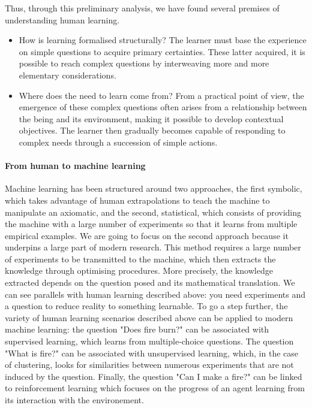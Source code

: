 Thus, through this preliminary analysis, we have found several premises of understanding human learning.

\begin{itemize}
    \item How is learning formalised structurally?
    The learner must base the experience on simple questions to acquire primary certainties. These latter acquired, it is possible to reach complex questions by interweaving more and more elementary considerations.
    \item Where does the need to learn come from?
    From a practical point of view, the emergence of these complex questions often arises from a relationship between the being and its environment, making it possible to develop contextual objectives. The learner then gradually becomes capable of responding to complex needs through a succession of simple actions.
\end{itemize}
 
\paragraph{From human to machine learning} 

Machine learning has been structured around two approaches, the first symbolic, which takes advantage of human extrapolations to teach the machine to manipulate an axiomatic, and the second, statistical, which consists of providing the machine with a large number of experiments so that it learns from multiple empirical examples. We are going to focus on the second approach because it underpins a large part of modern research.
This method requires a large number of experiments to be transmitted to the machine, which then extracts the knowledge through optimising procedures. More precisely, the knowledge extracted depends on the question posed and its mathematical translation. We can see parallels with human learning described above: you need experiments and a question to reduce reality to something learnable. To go a step further, the variety of human learning scenarios described above can be applied to modern machine learning: the question "Does fire burn?" can be associated with supervised learning, which learns from multiple-choice questions. The question "What is fire?" can be associated with unsupervised learning, which, in the case of clustering, looks for similarities between numerous experiments that are not induced by the question. Finally, the question "Can I make a fire?" can be linked to reinforcement learning which focuses on the progress of an agent learning from its interaction with the environement.

